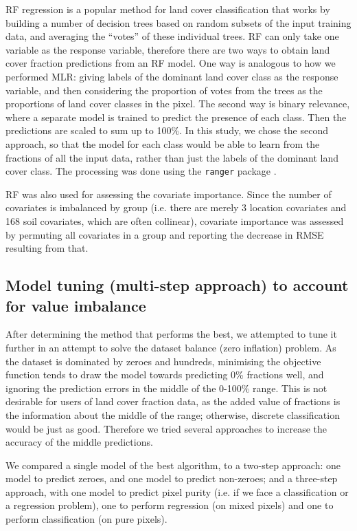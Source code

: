 \documentclass[a4paper,10pt]{article}
\begin{document}
\ac{RF} regression is a popular method for land cover classification that works by building a number of decision trees based on random subsets of the input training data, and averaging the ``votes'' of these individual trees.
\ac{RF} can only take one variable as the response variable, therefore there are two ways to obtain land cover fraction predictions from an \ac{RF} model.
One way is analogous to how we performed \ac{MLR}: giving labels of the dominant land cover class as the response variable, and then considering the proportion of votes from the trees as the proportions of land cover classes in the pixel.
The second way is binary relevance, where a separate model is trained to predict the presence of each class.
Then the predictions are scaled to sum up to 100\%.
In this study, we chose the second approach, so that the model for each class would be able to learn from the fractions of all the input data, rather than just the labels of the dominant land cover class.
The processing was done using the \texttt{ranger} package \citep{ranger}.

\ac{RF} was also used for assessing the covariate importance.
Since the number of covariates is imbalanced by group (i.e. there are merely 3 location covariates and 168 soil covariates, which are often collinear), covariate importance was assessed by permuting all covariates in a group and reporting the decrease in \ac{RMSE} resulting from that.

\subsection{Model tuning (multi-step approach) to account for value imbalance}

After determining the method that performs the best, we attempted to tune it further in an attempt to solve the dataset balance (zero inflation) problem.
As the dataset is dominated by zeroes and hundreds, minimising the objective function tends to draw the model towards predicting 0\% fractions well, and ignoring the prediction errors in the middle of the 0-100\% range.
This is not desirable for users of land cover fraction data, as the added value of fractions is the information about the middle of the range; otherwise, discrete classification would be just as good.
Therefore we tried several approaches to increase the accuracy of the middle predictions.

We compared a single model of the best algorithm, to a two-step approach: one model to predict zeroes, and one model to predict non-zeroes; and a three-step approach, with one model to predict pixel purity (i.e. if we face a classification or a regression problem), one to perform regression (on mixed pixels) and one to perform classification (on pure pixels).
\end{document}
